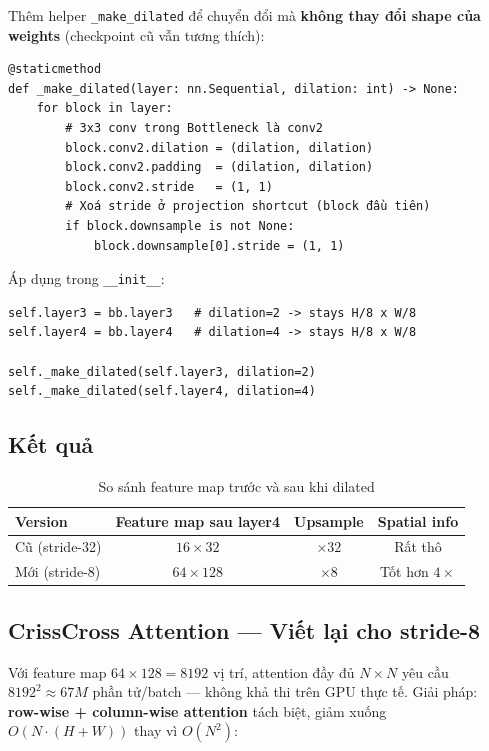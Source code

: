 \documentclass[12pt,a4paper]{article}
\begin{document}
Thêm helper \texttt{\_make\_dilated} để chuyển đổi mà \textbf{không thay đổi shape
của weights} (checkpoint cũ vẫn tương thích):

\begin{lstlisting}[caption={Hàm chuyển đổi sang dilated convolution}]
@staticmethod
def _make_dilated(layer: nn.Sequential, dilation: int) -> None:
    for block in layer:
        # 3x3 conv trong Bottleneck là conv2
        block.conv2.dilation = (dilation, dilation)
        block.conv2.padding  = (dilation, dilation)
        block.conv2.stride   = (1, 1)
        # Xoá stride ở projection shortcut (block đầu tiên)
        if block.downsample is not None:
            block.downsample[0].stride = (1, 1)
\end{lstlisting}

Áp dụng trong \texttt{\_\_init\_\_}:

\begin{lstlisting}[caption={Kích hoạt dilated trong constructor}]
self.layer3 = bb.layer3   # dilation=2 -> stays H/8 x W/8
self.layer4 = bb.layer4   # dilation=4 -> stays H/8 x W/8

self._make_dilated(self.layer3, dilation=2)
self._make_dilated(self.layer4, dilation=4)
\end{lstlisting}

\subsection{Kết quả}

\begin{table}[H]
  \centering
  \caption{So sánh feature map trước và sau khi dilated}
  \begin{tabular}{lccc}
    \toprule
    \textbf{Version} & \textbf{Feature map sau layer4} & \textbf{Upsample} & \textbf{Spatial info} \\
    \midrule
    Cũ (stride-32) & $16\times32$ & $\times32$ & Rất thô \\
    Mới (stride-8)  & $64\times128$ & $\times8$  & Tốt hơn $4\times$ \\
    \bottomrule
  \end{tabular}
\end{table}

\subsection{CrissCross Attention — Viết lại cho stride-8}

Với feature map $64\times128 = 8192$ vị trí, attention đầy đủ $N\times N$ yêu cầu
$8192^2 \approx 67M$ phần tử/batch — không khả thi trên GPU thực tế. Giải pháp:
\textbf{row-wise + column-wise attention} tách biệt, giảm xuống
$O(N\cdot(H+W))$ thay vì $O(N^2)$:
\end{document}
